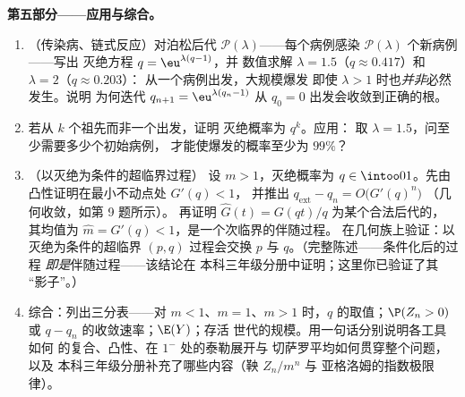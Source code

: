 \begin{problem}
\medskip
\noindent\textbf{第五部分——应用与综合。}
\begin{enumerate}[resume]
  \item （传染病、链式反应）对泊松后代
        $\mathcal P(\lambda)$——每个病例感染
        $\mathcal P(\lambda)$ 个新病例——写出
        灭绝方程 $q = \eu^{\lambda(q-1)}$，并
        数值求解 $\lambda = 1.5$（$q \approx
        0.417$）和 $\lambda = 2$（$q \approx 0.203$）：
        从一个病例出发，大规模爆发
        即使 $\lambda > 1$ 时也\emph{并非}必然发生。说明
        为何迭代 $q_{n+1} = \eu^{\lambda(q_n - 1)}$
        从 $q_0 = 0$ 出发会收敛到正确的根。
  \item 若从 $k$ 个祖先而非一个出发，证明
        灭绝概率为 $q^k$。应用：
        取 $\lambda = 1.5$，问至少需要多少个初始病例，
        才能使爆发的概率至少为 $99\%$？
  \item （以灭绝为条件的超临界过程）
        设 $m > 1$，灭绝概率为 $q \in
        \intoo01$。先由凸性证明在最小不动点处 $G'(q) < 1$，
        并推出
        $q_{\mathrm{ext}} - q_n = O\bigl(G'(q)^n\bigr)$
        （几何收敛，如第 9 题所示）。
        再证明 $\widehat G(t) = G(qt)/q$ 为某个合法后代的，
        其均值为 $\widehat m =
        G'(q) < 1$，是一个次临界的伴随过程。
        在几何族上验证：以灭绝为条件的超临界
        $(p, q)$ 过程会交换
        $p$ 与 $q$。（完整陈述——条件化后的过程
        \emph{即是}伴随过程——该结论在
        本科三年级分册中证明；这里你已验证了其
        “影子”。）
  \item 综合：列出三分表——对 $m <
        1$、$m = 1$、$m > 1$ 时，$q$ 的取值；$\P(Z_n >
        0)$ 或 $q - q_n$ 的收敛速率；$\E(Y)$；存活
        世代的规模。用一句话分别说明各工具如何
        的复合、凸性、在 $1^-$ 处的泰勒展开与
        切萨罗平均如何贯穿整个问题，以及
        本科三年级分册补充了哪些内容（鞅 $Z_n/m^n$ 与
        亚格洛姆的指数极限律）。
\end{enumerate}
\end{problem}
